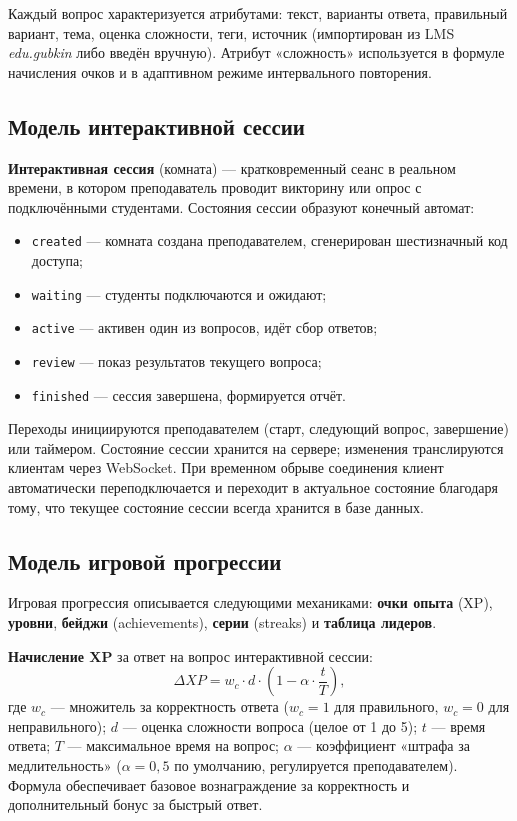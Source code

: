 Каждый вопрос характеризуется атрибутами: текст, варианты ответа,
правильный вариант, тема, оценка сложности, теги, источник
(импортирован из LMS \textit{edu.gubkin} либо введён вручную).
Атрибут «сложность» используется в формуле начисления очков
и в адаптивном режиме интервального повторения.

\subsection{Модель интерактивной сессии}

\textbf{Интерактивная сессия} (комната) --- кратковременный
сеанс в реальном времени, в котором преподаватель проводит
викторину или опрос с подключёнными студентами. Состояния сессии
образуют конечный автомат:
\begin{itemize}[noitemsep]
    \item \texttt{created} --- комната создана преподавателем,
          сгенерирован шестизначный код доступа;
    \item \texttt{waiting} --- студенты подключаются и ожидают;
    \item \texttt{active} --- активен один из вопросов, идёт сбор
          ответов;
    \item \texttt{review} --- показ результатов текущего вопроса;
    \item \texttt{finished} --- сессия завершена, формируется отчёт.
\end{itemize}

Переходы инициируются преподавателем (старт, следующий вопрос,
завершение) или таймером. Состояние сессии хранится на сервере;
изменения транслируются клиентам через WebSocket. При временном
обрыве соединения клиент автоматически переподключается
и переходит в актуальное состояние благодаря тому, что текущее
состояние сессии всегда хранится в базе данных.

\subsection{Модель игровой прогрессии}

Игровая прогрессия описывается следующими механиками:
\textbf{очки опыта} (XP), \textbf{уровни},
\textbf{бейджи} (achievements), \textbf{серии}
(streaks) и \textbf{таблица лидеров}.

\textbf{Начисление XP} за ответ на вопрос интерактивной сессии:
\[
    \Delta XP = w_c \cdot d \cdot \left(1 - \alpha \cdot \frac{t}{T}\right),
\]
где $w_c$ --- множитель за корректность ответа
($w_c = 1$ для правильного, $w_c = 0$ для неправильного);
$d$ --- оценка сложности вопроса (целое от 1 до 5);
$t$ --- время ответа; $T$ --- максимальное время на вопрос;
$\alpha$ --- коэффициент «штрафа за медлительность»
($\alpha = 0{,}5$ по умолчанию, регулируется преподавателем).
Формула обеспечивает базовое вознаграждение за корректность
и дополнительный бонус за быстрый ответ.

